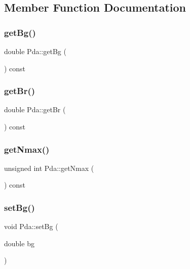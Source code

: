 \subsection{Member Function Documentation}
\mbox{\label{class_pda_a769d8bdf3a739d421e226e126aae2d42}} 
\subsubsection{\texorpdfstring{get\+Bg()}{getBg()}}
{\footnotesize\ttfamily double Pda\+::get\+Bg (\begin{DoxyParamCaption}{ }\end{DoxyParamCaption}) const}

\mbox{\label{class_pda_adc2d16391e665139ea51a3489e7d8e3c}} 
\subsubsection{\texorpdfstring{get\+Br()}{getBr()}}
{\footnotesize\ttfamily double Pda\+::get\+Br (\begin{DoxyParamCaption}{ }\end{DoxyParamCaption}) const}

\mbox{\label{class_pda_aca50144f22170263ef05997e5eefeff6}} 
\subsubsection{\texorpdfstring{get\+Nmax()}{getNmax()}}
{\footnotesize\ttfamily unsigned int Pda\+::get\+Nmax (\begin{DoxyParamCaption}{ }\end{DoxyParamCaption}) const}

\mbox{\label{class_pda_a64baea621f7aef17b43ee65b2a0c0aff}} 
\subsubsection{\texorpdfstring{set\+Bg()}{setBg()}}
{\footnotesize\ttfamily void Pda\+::set\+Bg (\begin{DoxyParamCaption}\item[{double}]{bg }\end{DoxyParamCaption})}

